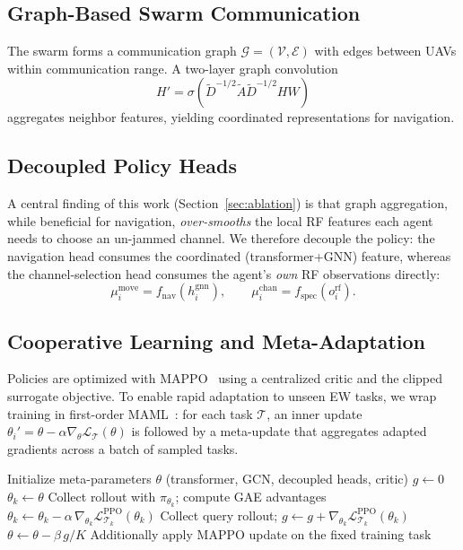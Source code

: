 \documentclass[journal]{IEEEtran}
\begin{document}
\subsection{Graph-Based Swarm Communication}
The swarm forms a communication graph $\mathcal{G}=(\mathcal{V},\mathcal{E})$
with edges between UAVs within communication range. A two-layer graph convolution~\cite{kipf2017semi}
\begin{equation}
H' = \sigma\!\left(\tilde{D}^{-1/2}\tilde{A}\tilde{D}^{-1/2} H W\right)
\end{equation}
aggregates neighbor features, yielding coordinated representations for
navigation.

\subsection{Decoupled Policy Heads}
A central finding of this work (Section~\ref{sec:ablation}) is that graph
aggregation, while beneficial for navigation, \emph{over-smooths} the local
RF features each agent needs to choose an un-jammed channel. We therefore
decouple the policy: the navigation head consumes the coordinated
(transformer+GNN) feature, whereas the channel-selection head consumes the
agent's \emph{own} RF observations directly:
\begin{equation}
\mu_i^{\text{move}} = f_{\text{nav}}(h_i^{\text{gnn}}), \qquad
\mu_i^{\text{chan}} = f_{\text{spec}}(o_i^{\text{rf}}) .
\end{equation}

\subsection{Cooperative Learning and Meta-Adaptation}
Policies are optimized with MAPPO~\cite{yu2022surprising} using a centralized
critic and the clipped surrogate objective. To enable rapid adaptation to unseen
EW tasks, we wrap training in first-order MAML~\cite{finn2017model}: for each
task $\mathcal{T}$, an inner update
$\theta_i' = \theta - \alpha \nabla_\theta \mathcal{L}_{\mathcal{T}}(\theta)$
is followed by a meta-update that aggregates adapted gradients across a batch of
sampled tasks.

\begin{algorithm}[!t]
\caption{XM-MADRL training (first-order MAML + MAPPO)}
\label{alg:train}
\begin{algorithmic}[1]
\State Initialize meta-parameters $\theta$ (transformer, GCN, decoupled heads, critic)
  \State $g \gets 0$
    \State $\theta_k \gets \theta$
      \State Collect rollout with $\pi_{\theta_k}$; compute GAE advantages
      \State $\theta_k \gets \theta_k - \alpha\,\nabla_{\theta_k}\mathcal{L}^{\text{PPO}}_{\mathcal{T}_k}(\theta_k)$
    \EndFor
    \State Collect query rollout; $g \gets g + \nabla_{\theta_k}\mathcal{L}^{\text{PPO}}_{\mathcal{T}_k}(\theta_k)$
  \EndFor
  \State $\theta \gets \theta - \beta\, g / K$ 
  \State Additionally apply MAPPO update on the fixed training task
\EndFor
\end{algorithmic}
\end{algorithm}
\end{document}

